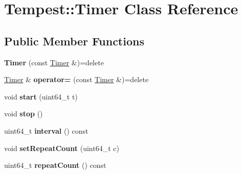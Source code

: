 \hypertarget{class_tempest_1_1_timer}{\section{Tempest\+:\+:Timer Class Reference}
\label{class_tempest_1_1_timer}
}
\subsection*{Public Member Functions}
\begin{DoxyCompactItemize}
\item 
\hypertarget{class_tempest_1_1_timer_a51b02fccc663c2446e1d9df3b1f08dee}{{\bfseries Timer} (const \hyperlink{class_tempest_1_1_timer}{Timer} \&)=delete}\label{class_tempest_1_1_timer_a51b02fccc663c2446e1d9df3b1f08dee}

\item 
\hypertarget{class_tempest_1_1_timer_a583148464d08211d849e1cbf90b72e2d}{\hyperlink{class_tempest_1_1_timer}{Timer} \& {\bfseries operator=} (const \hyperlink{class_tempest_1_1_timer}{Timer} \&)=delete}\label{class_tempest_1_1_timer_a583148464d08211d849e1cbf90b72e2d}

\item 
\hypertarget{class_tempest_1_1_timer_aa8070093d3740e96c23728bc9afc970d}{void {\bfseries start} (uint64\+\_\+t t)}\label{class_tempest_1_1_timer_aa8070093d3740e96c23728bc9afc970d}

\item 
\hypertarget{class_tempest_1_1_timer_a63f0eb44b27402196590a03781515dba}{void {\bfseries stop} ()}\label{class_tempest_1_1_timer_a63f0eb44b27402196590a03781515dba}

\item 
\hypertarget{class_tempest_1_1_timer_aca6c4241c3da63ae449f9f5a55dc3cbb}{uint64\+\_\+t {\bfseries interval} () const }\label{class_tempest_1_1_timer_aca6c4241c3da63ae449f9f5a55dc3cbb}

\item 
\hypertarget{class_tempest_1_1_timer_a261d116a5bb9f0899a56dcb91b3477e8}{void {\bfseries set\+Repeat\+Count} (uint64\+\_\+t c)}\label{class_tempest_1_1_timer_a261d116a5bb9f0899a56dcb91b3477e8}

\item 
\hypertarget{class_tempest_1_1_timer_a0321f0262305a857a31c13ec4f8ac27f}{uint64\+\_\+t {\bfseries repeat\+Count} () const }\label{class_tempest_1_1_timer_a0321f0262305a857a31c13ec4f8ac27f}

\end{DoxyCompactItemize}
